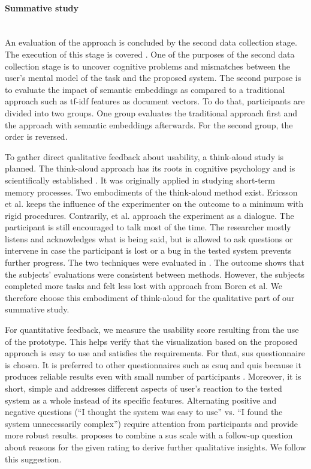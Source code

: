 \paragraph{Summative study}~\\
An evaluation of the approach is concluded by the second data collection stage.
The execution of this stage is covered \label{ch:evaluation}.
One of the purposes of the second data collection stage is to uncover cognitive problems and mismatches between the user's mental model of the task and the proposed system.
The second purpose is to evaluate the impact of semantic embeddings as compared to a traditional approach such as \gls{tf-idf} features as document vectors. 
To do that, participants are divided into two groups. 
One group evaluates the traditional approach first and the approach with semantic embeddings afterwards. 
For the second group, the order is reversed.

To gather direct qualitative feedback about usability, a think-aloud study is planned.
The think-aloud approach has its roots in cognitive psychology and is scientifically established \cite{Simon2006} \cite{Ericsson1980}.
It was originally applied in studying short-term memory processes.
Two embodiments of the think-aloud method exist. Ericsson et al.
\cite{ericsson1984protocol} keeps the influence of the experimenter on the outcome to a minimum with rigid procedures.
Contrarily, \cite{Boren2000} et al. approach the experiment as a dialogue.
The participant is still encouraged to talk most of the time.
The researcher mostly listens and acknowledges what is being said, but is allowed to ask questions or intervene in case the participant is lost or a bug in the tested system prevents further progress.
The two techniques were evaluated in \cite{Krahmer2004}.
The outcome shows that the subjects' evaluations were consistent between methods.
However, the subjects completed more tasks and felt less lost with approach from Boren et al.
We therefore choose this embodiment of think-aloud for the qualitative part of our summative study.

For quantitative feedback, we measure the usability score resulting from the use of the prototype.
This helps verify that the visualization based on the proposed approach is easy to use and satisfies the requirements.
For that, \gls{sus} questionnaire \cite{Brooke1996} is chosen.
It is preferred to other questionnaires such as \gls{csuq} \cite{Lewis1993} and \gls{quis} \cite{Chin2003} because it produces reliable results even with small number of participants \cite{Tullis2004}. 
Moreover, it is short, simple and addresses different aspects of user's reaction to the tested system as a whole instead of its specific features.
Alternating positive and negative questions (``I thought the system was easy to use'' vs. ``I found the system unnecessarily complex'') require attention from participants and provide more robust results.
\cite{Laubheimer2018} proposes to combine a \gls{sus} scale with a follow-up question about reasons for the given rating to derive further qualitative insights. 
We follow this suggestion. 

